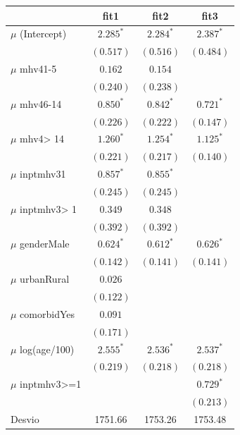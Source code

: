 \documentclass[
  11pt,
]{article}
\begin{document}
\begin{table}
\begin{center}
\begin{tabular}{l c c c}
\hline
 & fit1 & fit2 & fit3 \\
\hline
$\mu$ (Intercept)  & $2.285^{*}$ & $2.284^{*}$ & $2.387^{*}$ \\
                   & $(0.517)$   & $(0.516)$   & $(0.484)$   \\
$\mu$ mhv41-5      & $0.162$     & $0.154$     &             \\
                   & $(0.240)$   & $(0.238)$   &             \\
$\mu$ mhv46-14     & $0.850^{*}$ & $0.842^{*}$ & $0.721^{*}$ \\
                   & $(0.226)$   & $(0.222)$   & $(0.147)$   \\
$\mu$ mhv4> 14     & $1.260^{*}$ & $1.254^{*}$ & $1.125^{*}$ \\
                   & $(0.221)$   & $(0.217)$   & $(0.140)$   \\
$\mu$ inptmhv31    & $0.857^{*}$ & $0.855^{*}$ &             \\
                   & $(0.245)$   & $(0.245)$   &             \\
$\mu$ inptmhv3> 1  & $0.349$     & $0.348$     &             \\
                   & $(0.392)$   & $(0.392)$   &             \\
$\mu$ genderMale   & $0.624^{*}$ & $0.612^{*}$ & $0.626^{*}$ \\
                   & $(0.142)$   & $(0.141)$   & $(0.141)$   \\
$\mu$ urbanRural   & $0.026$     &             &             \\
                   & $(0.122)$   &             &             \\
$\mu$ comorbidYes  & $0.091$     &             &             \\
                   & $(0.171)$   &             &             \\
$\mu$ log(age/100) & $2.555^{*}$ & $2.536^{*}$ & $2.537^{*}$ \\
                   & $(0.219)$   & $(0.218)$   & $(0.218)$   \\
$\mu$ inptmhv3>=1  &             &             & $0.729^{*}$ \\
                   &             &             & $(0.213)$   \\
\hline
Desvio             & 1751.66     & 1753.26     & 1753.48     \\

\end{tabular}
\end{center}
\end{table}
\end{document}
